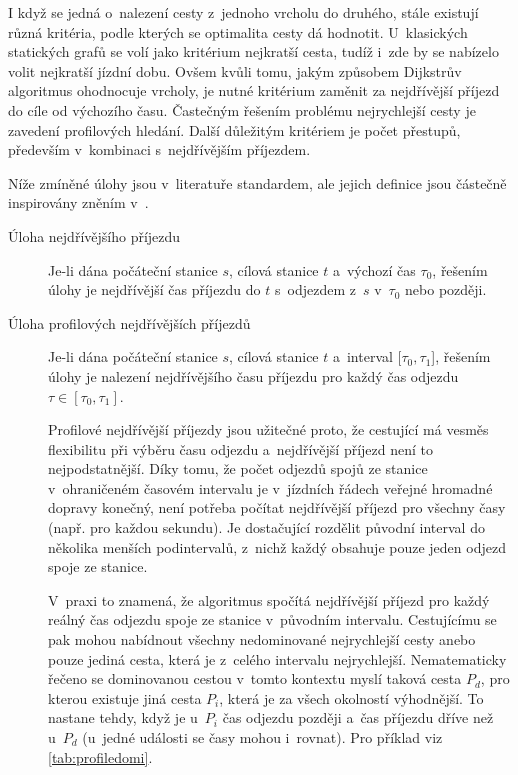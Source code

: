 I když se jedná o~nalezení cesty z~jednoho vrcholu do druhého, stále existují různá kritéria, podle kterých se optimalita cesty dá hodnotit. U~klasických statických grafů se volí jako kritérium nejkratší cesta, tudíž i~zde by se nabízelo volit nejkratší jízdní dobu. Ovšem kvůli tomu, jakým způsobem Dijkstrův algoritmus ohodnocuje vrcholy, je nutné kritérium zaměnit za nejdřívější příjezd do cíle od výchozího času. Častečným řešením problému nejrychlejší cesty je zavedení profilových hledání. Další důležitým kritériem je počet přestupů, především v~kombinaci s~nejdřívějším příjezdem. 

Níže zmíněné úlohy jsou v~literatuře standardem, ale jejich definice jsou částečně inspirovány zněním v~\cite{dibbelt2017CSA,pyrga2008efficient}. 

\begin{description}
	\item[Úloha nejdřívějšího příjezdu] Je-li dána počáteční stanice $s$, cílová stanice $t$ a~výchozí čas $\tau_0$, řešením úlohy je nejdřívější čas příjezdu do $t$ s~odjezdem z~$s$ v~$\tau_0$ nebo později. 

	\item[Úloha profilových nejdřívějších příjezdů] Je-li dána počáteční stanice $s$, cílová stanice $t$ a~interval [$\tau_0, \tau_1$], řešením úlohy je nalezení nejdřívějšího času příjezdu pro každý čas odjezdu $\tau \in [\tau_0, \tau_1]$. 
	
	Profilové nejdřívější příjezdy jsou užitečné proto, že cestující má vesměs flexibilitu při výběru času odjezdu a~nejdřívější příjezd není to nejpodstatnější. Díky tomu, že počet odjezdů spojů ze stanice v~ohraničeném časovém intervalu je v~jízdních řádech veřejné hromadné dopravy konečný, není potřeba počítat nejdřívější příjezd pro všechny časy (např. pro každou sekundu). Je dostačující rozdělit původní interval do několika menších podintervalů, z~nichž každý obsahuje pouze jeden odjezd spoje ze stanice.
	
	\renewcommand{\tableautorefname}{tabulku}
	V~praxi to znamená, že algoritmus spočítá nejdřívější příjezd pro každý reálný čas odjezdu spoje ze stanice v~původním intervalu. Cestujícímu se pak mohou nabídnout všechny nedominované nejrychlejší cesty anebo pouze jediná cesta, která je z~celého intervalu nejrychlejší. Nematematicky řečeno se dominovanou cestou v~tomto kontextu myslí taková cesta \(P_d\), pro kterou existuje jiná cesta \(P_i\), která je za všech okolností výhodnější. To nastane tehdy, když je u~\(P_i\) čas odjezdu později a~čas příjezdu dříve než u~\(P_d\) (u~jedné události se časy mohou i~rovnat). Pro příklad viz \autoref{tab:profiledomi}.
		

\end{description}
